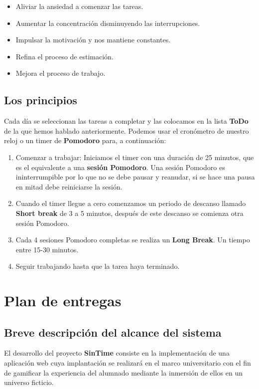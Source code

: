 \begin{itemize}
	\item Aliviar la ansiedad a comenzar las tareas.
	\item Aumentar la concentración disminuyendo las interrupciones.
	\item Impulsar la motivación y nos mantiene constantes.
	\item Refina el proceso de estimación.
	\item Mejora el proceso de trabajo.
\end{itemize}

\subsection{Los principios}

Cada día se seleccionan las tareas a completar y las colocamos en la lista \textbf{ToDo} de la que hemos hablado anteriormente. Podemos usar el cronómetro de nuestro reloj o un timer de \textbf{Pomodoro} para, a continuación:

\begin{enumerate}
	\item Comenzar a trabajar: Iniciamos el timer con una duración de 25 minutos, que es el equivalente a una \textbf{sesión Pomodoro}. Una sesión Pomodoro es ininterrumpible por lo que no se debe pausar y reanudar, si se hace una pausa en mitad debe reiniciarse la sesión.
	\item Cuando el timer llegue a cero comenzamos un periodo de descanso llamado \textbf{Short break} de 3 a 5 minutos, después de este descanso se comienza otra sesión Pomodoro.
	\item Cada 4 sesiones Pomodoro completas se realiza un \textbf{Long Break}. Un tiempo entre 15-30 minutos.
	\item Seguir trabajando hasta que la tarea haya terminado.
\end{enumerate}

\newpage

\section{Plan de entregas}

\subsection{Breve descripción del alcance del sistema}
El desarrollo del proyecto \textbf{SinTime} consiste en la implementación de una aplicación web cuya implantación se realizará en el marco universitario con el fin de gamificar la experiencia del alumnado mediante la inmersión de ellos en un universo ficticio.\\


